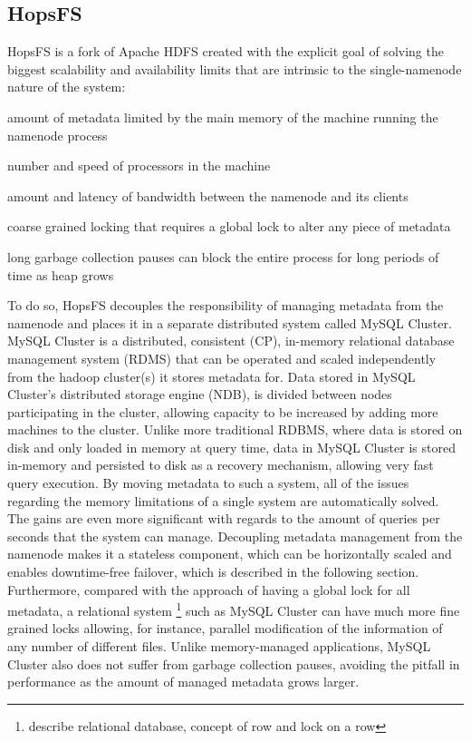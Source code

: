 \subsection{HopsFS}
HopsFS \cite{DBLP:conf/fast/NiaziIHDGR17} is a fork of Apache HDFS created with the explicit goal of solving the biggest scalability and availability limits that are intrinsic to the single-namenode nature of the system: 
\begin{inparaenum}[i)]
    \item amount of metadata limited by the main memory of the machine running the namenode process
    \item number and speed of processors in the machine
    \item amount and latency of bandwidth between the namenode and its clients
    \item coarse grained locking that requires a global lock to alter any piece of metadata
    \item long garbage collection pauses can block the entire process for long periods of time as heap grows
\end{inparaenum}
To do so, HopsFS decouples the responsibility of managing metadata from the namenode and places it in a separate distributed system called MySQL Cluster.
MySQL Cluster is a distributed, consistent (CP), in-memory relational database management system (RDMS) that can be operated and scaled independently from the hadoop cluster(s) it stores metadata for.
Data stored in MySQL Cluster's distributed storage engine (NDB), is divided between nodes participating in the cluster, allowing capacity to be increased by adding more machines to the cluster.
Unlike more traditional RDBMS, where data is stored on disk and only loaded in memory at query time, data in MySQL Cluster is stored in-memory and persisted to disk as a recovery mechanism, allowing very fast query execution.
By moving metadata to such a system, all of the issues regarding the memory limitations of a single system are automatically solved.
The gains are even more significant with regards to the amount of queries per seconds that the system can manage.
Decoupling metadata management from the namenode makes it a stateless component, which can be horizontally scaled and enables downtime-free failover, which is described in the following section.
Furthermore, compared with the approach of having a global lock for all metadata, a relational system \footnote{describe relational database, concept of row and lock on a row} such as MySQL Cluster can have much more fine grained locks allowing, for instance, parallel modification of the information of any number of different files.
Unlike memory-managed applications, MySQL Cluster also does not suffer from garbage collection pauses, avoiding the pitfall in performance as the amount of managed metadata grows larger.


